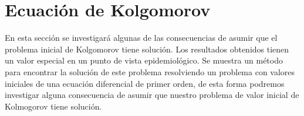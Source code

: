 \section{Ecuación de Kolgomorov}
\begin{comment}
    Usando la ecuación de Chapman-Kolgomorov se obtiene que
    $$P_{m,n}(s,t)=\sum_{k=0}^\infty P_{m,k}(s,u)P_{k,n}(u,t),$$
    $$\Pi_{i,j}(s,t)=\sum_{k=0}^{N_2} \Pi_{i,k}(s,u)\Pi_{k,j}(u,t),$$
\end{comment}

En esta sección se investigará algunas de las consecuencias de asumir que el problema inicial de Kolgomorov tiene solución. Los resultados obtenidos tienen un valor especial en un punto de vista epidemiológico. Se muestra un método para encontrar la solución de este problema resolviendo un problema con valores iniciales de una ecuación diferencial de primer orden, de esta forma podremos investigar alguna consecuencia de asumir que nuestro problema de valor inicial de Kolmogorov tiene solución.

